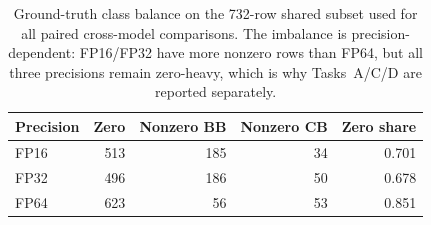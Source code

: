 \begin{table}[t]
  \centering
  \caption{Ground-truth class balance on the 732-row shared subset used for all paired cross-model comparisons. The imbalance is precision-dependent: FP16/FP32 have more nonzero rows than FP64, but all three precisions remain zero-heavy, which is why Tasks~A/C/D are reported separately.}
  \label{tab:shared-class-balance}
  \scriptsize
  \setlength{\tabcolsep}{4pt}
  \begin{tabular}{lrrrr}
    \toprule
    Precision & Zero & Nonzero BB & Nonzero CB & Zero share \\
    \midrule
    FP16 & 513 & 185 & 34 & 0.701 \\
    FP32 & 496 & 186 & 50 & 0.678 \\
    FP64 & 623 & 56 & 53 & 0.851 \\
    \bottomrule
  \end{tabular}
\end{table}
